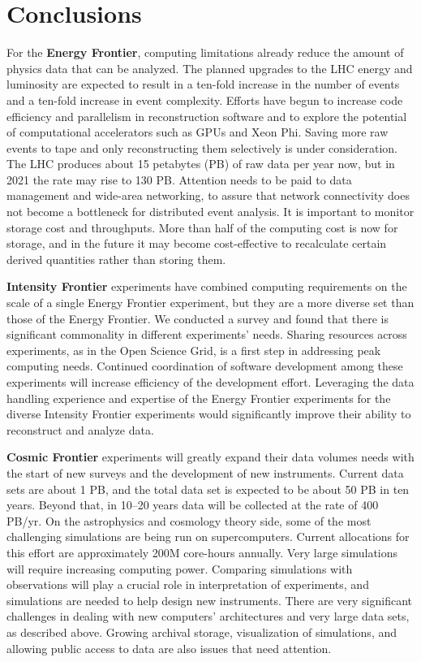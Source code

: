 \section{Conclusions}

For the {\bf Energy Frontier}, computing limitations already
reduce the amount of physics data that can be analyzed. The
planned upgrades to the LHC energy and luminosity are expected to result in
a ten-fold increase in the number of events and a ten-fold increase in
event complexity. Efforts have begun to increase code efficiency and
parallelism in reconstruction software and to explore the potential of
computational accelerators such as GPUs and Xeon Phi.
Saving more raw events to tape and only
reconstructing them selectively is under consideration. 
The LHC produces about 15 petabytes (PB) of raw data per
year now, but in 2021 the rate may rise to 130 PB. Attention needs to be
paid to data management and wide-area networking, to assure that network
connectivity does not become a bottleneck for distributed event
analysis. It is important to monitor storage cost and throughputs. More
than half of the computing cost is now for storage, and in the future it
may become cost-effective to recalculate certain derived quantities rather
than storing them.

{\bf Intensity Frontier} experiments have combined computing requirements
on the scale of a single Energy Frontier experiment, but they are a more
diverse set than those of the Energy Frontier.  
We conducted a survey and found that
there is significant commonality in different experiments' needs. Sharing
resources across experiments, as in the Open Science Grid, is a first step
in addressing peak computing needs.  Continued coordination of
software development among these experiments will increase efficiency of
the development effort.
Leveraging the data handling experience and
expertise of the Energy Frontier experiments for the diverse Intensity
Frontier experiments would significantly improve their ability to reconstruct
and analyze data.

{\bf Cosmic Frontier} experiments will greatly expand their data volumes needs
with the start of new surveys and the development of new instruments.
Current data sets are about 1 PB, and the total data set is expected to be
about 50 PB in ten years. Beyond that, in 10--20 years data will be
collected at the rate of 400 PB/yr. On the astrophysics and cosmology
theory side, some of the most challenging simulations are being run on
supercomputers. 
Current allocations for this effort are approximately 200M core-hours annually.
Very large simulations will require increasing computing
power. Comparing simulations with observations will play a crucial role in
interpretation of experiments, and simulations are needed to help design
new instruments. There are very significant challenges in dealing with new
computers' architectures and very large data sets, as described above.
Growing archival storage, visualization of simulations, and allowing public
access to data are also issues that need attention.


